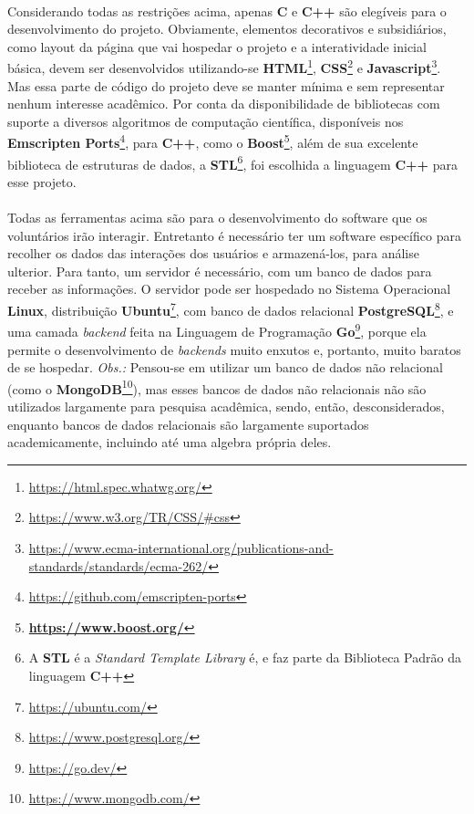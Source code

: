 \documentclass{article}
\begin{document}
	\paragraph{}
	Considerando todas as restrições acima, apenas \textbf{C} e \textbf{C++} são elegíveis para o desenvolvimento do projeto. Obviamente, elementos decorativos e subsidiários, como layout da página que vai hospedar o projeto e a interatividade inicial básica, devem ser desenvolvidos utilizando-se \textbf{HTML}\footnote{\url{https://html.spec.whatwg.org/}}, \textbf{CSS}\footnote{\url{https://www.w3.org/TR/CSS/\#css}} e \textbf{Javascript}\footnote{\url{https://www.ecma-international.org/publications-and-standards/standards/ecma-262/}}. Mas essa parte de código do projeto deve se manter mínima e sem representar nenhum interesse acadêmico. Por conta da disponibilidade de bibliotecas com suporte a diversos algoritmos de computação científica, disponíveis nos \textbf{Emscripten Ports}\footnote{\url{https://github.com/emscripten-ports}}, para \textbf{C++}, como o \textbf{Boost}\footnote{\textbf{\url{https://www.boost.org/}}}, além de sua excelente biblioteca de estruturas de dados, a \textbf{STL}\footnote{A \textbf{STL} é a \textit{Standard Template Library} é, e faz parte da Biblioteca Padrão da linguagem \textbf{C++}}, foi escolhida a linguagem \textbf{C++} para esse projeto.
	
	\paragraph{}
	Todas as ferramentas acima são para o desenvolvimento do software que os voluntários irão interagir. Entretanto é necessário ter um software específico para recolher os dados das interações dos usuários e armazená-los, para análise ulterior. Para tanto, um servidor é necessário, com um banco de dados para receber as informações. O servidor pode ser hospedado no Sistema Operacional \textbf{Linux}\textregistered, distribuição \textbf{Ubuntu}\texttrademark\footnote{\url{https://ubuntu.com/}}, com banco de dados relacional \textbf{PostgreSQL}\footnote{\url{https://www.postgresql.org/}}, e uma camada \textit{backend} feita na Linguagem de Programação \textbf{Go}\footnote{\url{https://go.dev/}}, porque ela permite o desenvolvimento de \textit{backends} muito enxutos e, portanto, muito baratos de se hospedar. \textit{Obs.:} Pensou-se em utilizar um banco de dados não relacional (como o \textbf{MongoDB}\footnote{\url{https://www.mongodb.com/}}), mas esses bancos de dados não relacionais não são utilizados largamente para pesquisa acadêmica, sendo, então, desconsiderados, enquanto bancos de dados relacionais são largamente suportados academicamente, incluindo até uma algebra própria deles.
	
\end{document}
